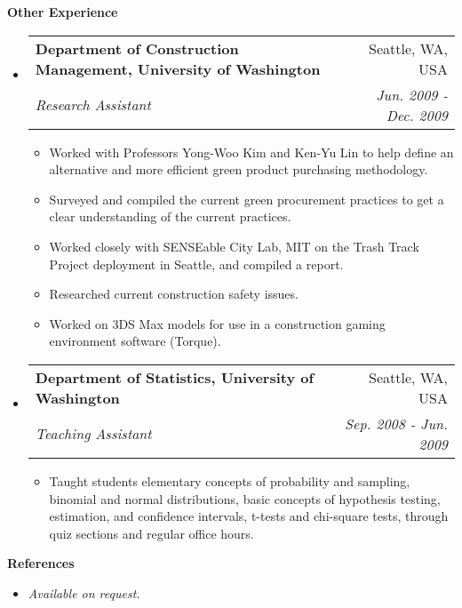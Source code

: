 \documentclass[letterpaper,10pt]{article}
\makeatletter
\newcommand{\resitem}[1]{\item #1}
\newcommand{\resheading}[1]{{\large \colorbox{mygrey}{\vspace{0.6in} \begin{minipage}{\textwidth}{\textbf{#1 \vphantom{p\^{E}}}}\end{minipage}}}}
\newcommand{\ressubheading}[4]{
\begin{tabular*}{7in}{l@{\extracolsep{\fill}}r}
		\textbf{#1} & #2 \\
		\textit{#3} & \textit{#4} \\
\end{tabular*}}
\makeatother
\begin{document}
\resheading{Other Experience}
\begin{itemize}

\item
  \ressubheading{Department of Construction Management, University of Washington}{Seattle, WA, USA}{Research Assistant}{Jun. 2009 - Dec. 2009}
  \begin{itemize}
    \resitem{Worked with Professors Yong-Woo Kim and Ken-Yu Lin to help define an alternative and more efficient green product purchasing methodology.}
    \resitem{Surveyed and compiled the current green procurement practices to get a clear understanding of the current practices.}
    \resitem{Worked closely with SENSEable City Lab, MIT on the Trash Track Project deployment in Seattle, and compiled a report.}
    \resitem{Researched current construction safety issues.}
    \resitem{Worked on 3DS Max models for use in a construction gaming environment software (Torque).}
   \end{itemize}

\item
  \ressubheading{Department of Statistics, University of Washington}{Seattle, WA, USA}{Teaching Assistant}{Sep. 2008 - Jun. 2009}
  \begin{itemize}
    \resitem{Taught students elementary concepts of probability and sampling, binomial and normal distributions, basic concepts of hypothesis testing, estimation, and confidence intervals, t-tests and chi-square tests, through quiz sections and regular office hours.}
  \end{itemize}

\end{itemize}
    
\resheading{References}
\begin{itemize}
\item \textit{Available on request.}
\end{itemize}

	
\end{document}

